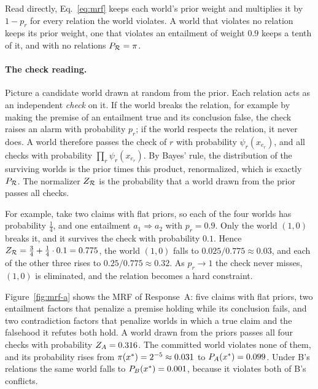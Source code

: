 

Read directly, Eq.~\ref{eq:mrf} keeps each world's prior weight and multiplies it by $1-p_r$ for
every relation the world violates. A world that violates no relation keeps its prior weight, one
that violates an entailment of weight $0.9$ keeps a tenth of it, and with no relations $P_{\mathcal{R}}=\pi$.

\paragraph{The check reading.} Picture a candidate world drawn at random from the prior. Each
relation acts as an independent \emph{check} on it. If the world breaks the relation, for example
by making the premise of an entailment true and its conclusion false, the check raises an alarm
with probability $p_r$; if the world respects the relation, it never does. A world therefore passes
the check of $r$ with probability $\psi_r(x_{e_r})$, and all checks with probability
$\prod_r\psi_r(x_{e_r})$. By Bayes' rule, the distribution of the surviving worlds is the prior
times this product, renormalized, which is exactly $P_{\mathcal{R}}$. The normalizer $Z_{\mathcal{R}}$ is the probability
that a world drawn from the prior passes all checks.

For example, take two claims with flat priors, so each of the four worlds has probability $\frac14$,
and one entailment $a_1\Rightarrow a_2$ with $p_r=0.9$. Only the world $(1,0)$ breaks it, and it
survives the check with probability $0.1$. Hence $Z_{\mathcal{R}}=\frac34+\frac14\cdot0.1=0.775$, the world
$(1,0)$ falls to $0.025/0.775\approx0.03$, and each of the other three rises to
$0.25/0.775\approx0.32$. As $p_r\to1$ the check never misses, $(1,0)$ is eliminated, and the
relation becomes a hard constraint.

Figure~\ref{fig:mrf-a} shows the MRF of Response~A: five claims with flat priors, two entailment
factors that penalize a premise holding while its conclusion fails, and two contradiction factors
that penalize worlds in which a true claim and the falsehood it refutes both hold. A world drawn
from the priors passes all four checks with probability $Z_A=0.316$. The committed world violates
none of them, and its probability rises from $\pi(x^{\ast})=2^{-5}\approx0.031$ to $P_A(x^{\ast})=0.099$.
Under B's relations the same world falls to $P_B(x^{\ast})=0.001$, because it violates both of B's
conflicts.

